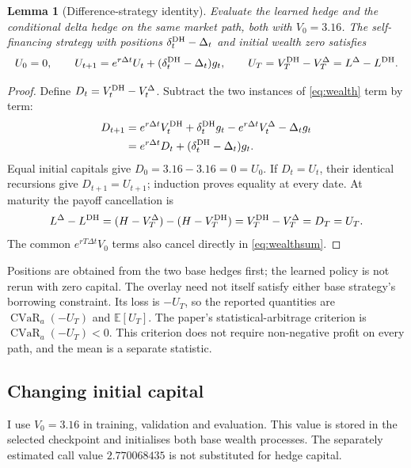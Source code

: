 \documentclass[11pt,a4paper]{article}
\newcommand{\E}{\mathbb E}
\newcommand{\CVaR}{\operatorname{CVaR}}
\newcommand{\dt}{\Delta t}
\newtheorem{lemma}{Lemma}
\theoremstyle{remark}
\begin{document}
\begin{lemma}[Difference-strategy identity]
Evaluate the learned hedge and the conditional delta hedge on the same market path, both with $V_0=3.16$. The self-financing strategy with positions $\delta_t^{\rm DH}-\Delta_t$ and initial wealth zero satisfies
\begin{equation}
 U_0=0,\qquad U_{t+1}=e^{r\dt}U_t+(\delta_t^{\rm DH}-\Delta_t)g_t,
 \qquad U_T=V_T^{\rm DH}-V_T^\Delta=L^\Delta-L^{\rm DH}.
 \label{eq:overlay}
\end{equation}
\end{lemma}
\begin{proof}
Define $D_t=V_t^{\rm DH}-V_t^\Delta$. Subtract the two instances of \eqref{eq:wealth} term by term:
\begin{align}
 D_{t+1}
 &=e^{r\dt}V_t^{\rm DH}+\delta_t^{\rm DH}g_t
   -e^{r\dt}V_t^\Delta-\Delta_tg_t\nonumber\\
 &=e^{r\dt}D_t+(\delta_t^{\rm DH}-\Delta_t)g_t.
\end{align}
Equal initial capitals give $D_0=3.16-3.16=0=U_0$. If $D_t=U_t$, their identical recursions give $D_{t+1}=U_{t+1}$; induction proves equality at every date. At maturity the payoff cancellation is
\begin{equation}
 L^\Delta-L^{\rm DH}
 =(H-V_T^\Delta)-(H-V_T^{\rm DH})
 =V_T^{\rm DH}-V_T^\Delta=D_T=U_T.
\end{equation}
The common $e^{rT\dt}V_0$ terms also cancel directly in \eqref{eq:wealthsum}.
\end{proof}
Positions are obtained from the two base hedges first; the learned policy is not rerun with zero capital. The overlay need not itself satisfy either base strategy's borrowing constraint. Its loss is $-U_T$, so the reported quantities are $\CVaR_a(-U_T)$ and $\E[U_T]$. The paper's statistical-arbitrage criterion is $\CVaR_a(-U_T)<0$. This criterion does not require non-negative profit on every path, and the mean is a separate statistic.

\subsection{Changing initial capital}
I use $V_0=3.16$ in training, validation and evaluation. This value is stored in the selected checkpoint and initialises both base wealth processes. The separately estimated call value $2.770068435$ is not substituted for hedge capital.
\end{document}

